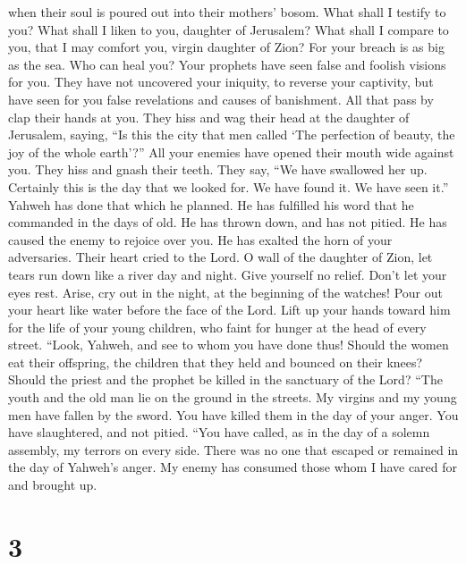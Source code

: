 when their soul is poured out into their mothers' bosom. 
What shall I testify to you? What shall I liken to you, daughter of
Jerusalem? What shall I compare to you, that I may comfort you, virgin
daughter of Zion? For your breach is as big as the sea. Who can heal
you?  Your prophets have seen false and foolish visions
for you. They have not uncovered your iniquity, to reverse your
captivity, but have seen for you false revelations and causes of
banishment.  All that pass by clap their hands at you.
They hiss and wag their head at the daughter of Jerusalem, saying, ``Is
this the city that men called `The perfection of beauty, the joy of the
whole earth'?''  All your enemies have opened their mouth
wide against you. They hiss and gnash their teeth. They say, ``We have
swallowed her up. Certainly this is the day that we looked for. We have
found it. We have seen it.''  Yahweh has done that which
he planned. He has fulfilled his word that he commanded in the days of
old. He has thrown down, and has not pitied. He has caused the enemy to
rejoice over you. He has exalted the horn of your adversaries.
 Their heart cried to the Lord. O wall of the daughter of
Zion, let tears run down like a river day and night. Give yourself no
relief. Don't let your eyes rest.  Arise, cry out in the
night, at the beginning of the watches! Pour out your heart like water
before the face of the Lord. Lift up your hands toward him for the life
of your young children, who faint for hunger at the head of every
street.  ``Look, Yahweh, and see to whom you have done
thus! Should the women eat their offspring, the children that they held
and bounced on their knees? Should the priest and the prophet be killed
in the sanctuary of the Lord?  ``The youth and the old
man lie on the ground in the streets. My virgins and my young men have
fallen by the sword. You have killed them in the day of your anger. You
have slaughtered, and not pitied.  ``You have called, as
in the day of a solemn assembly, my terrors on every side. There was no
one that escaped or remained in the day of Yahweh's anger. My enemy has
consumed those whom I have cared for and brought up.

\hypertarget{section-2}{%
\section{3}\label{section-2}}


